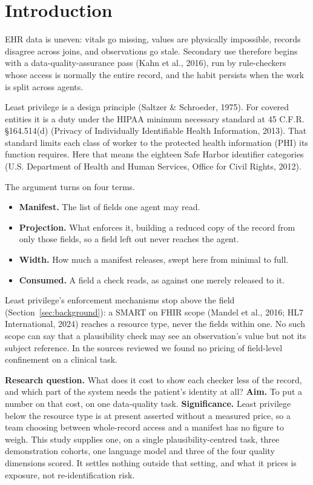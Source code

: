 \section{Introduction}
\label{sec:intro}

EHR data is uneven: vitals go missing, values are physically impossible, records disagree across
joins, and observations go stale. Secondary use therefore begins with a data-quality-assurance pass
(Kahn et al., 2016), run by rule-checkers whose access is normally the entire record, and the habit
persists when the work is split across agents.

Least privilege is a design principle (Saltzer \& Schroeder, 1975). For covered entities it is a
duty under the HIPAA minimum necessary standard at 45 C.F.R. \S 164.514(d) (Privacy of Individually
Identifiable Health Information, 2013). That standard limits each class of worker to the protected
health information (PHI) its function requires. Here that means the eighteen Safe Harbor identifier
categories (U.S. Department of Health and Human Services, Office for Civil Rights, 2012).

The argument turns on four terms.

\begin{itemize}[leftmargin=1.4em, itemsep=0.15em]
  \item \textbf{Manifest.} The list of fields one agent may read.
  \item \textbf{Projection.} What enforces it, building a reduced copy of the record from only those
        fields, so a field left out never reaches the agent.
  \item \textbf{Width.} How much a manifest releases, swept here from minimal to full.
  \item \textbf{Consumed.} A field a check reads, as against one merely released to it.
\end{itemize}

Least privilege's enforcement mechanisms stop above the field (Section~\ref{sec:background}): a SMART
on FHIR scope (Mandel et al., 2016; HL7 International, 2024) reaches a resource type, never the
fields within one. No such scope can say that a plausibility check may see an observation's value but
not its subject reference. In the sources reviewed we found no pricing of field-level confinement on
a clinical task.

\textbf{Research question.} What does it cost to show each checker less of the record, and which
part of the system needs the patient's identity at all? \textbf{Aim.} To put a number on that cost,
on one data-quality task. \textbf{Significance.}
Least privilege below the resource type is at present asserted without a measured price, so a team
choosing between whole-record access and a manifest has no figure to weigh. This study supplies one,
on a single plausibility-centred task, three demonstration cohorts, one language model and three of
the four quality dimensions scored. It settles nothing outside that setting, and what it prices is
exposure, not re-identification risk.

